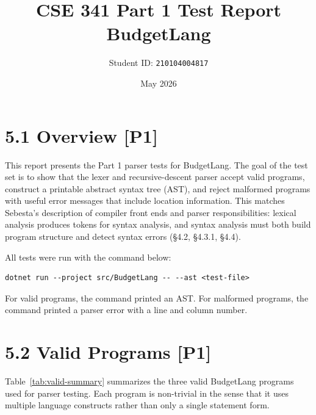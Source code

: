 \documentclass[11pt]{article}
\title{CSE 341 Part 1 Test Report\\BudgetLang}
\author{Student ID: \texttt{210104004817}}
\date{May 2026}
\begin{document}
\maketitle

\section*{5.1 Overview [P1]}
This report presents the Part 1 parser tests for BudgetLang. The goal of the test set is to show that the lexer and recursive-descent parser accept valid programs, construct a printable abstract syntax tree (AST), and reject malformed programs with useful error messages that include location information. This matches Sebesta's description of compiler front ends and parser responsibilities: lexical analysis produces tokens for syntax analysis, and syntax analysis must both build program structure and detect syntax errors (\S4.2, \S4.3.1, \S4.4).

All tests were run with the command below:

\begin{verbatim}
dotnet run --project src/BudgetLang -- --ast <test-file>
\end{verbatim}

For valid programs, the command printed an AST. For malformed programs, the command printed a parser error with a line and column number.

\section*{5.2 Valid Programs [P1]}
Table~\ref{tab:valid-summary} summarizes the three valid BudgetLang programs used for parser testing. Each program is non-trivial in the sense that it uses multiple language constructs rather than only a single statement form.
\end{document}
